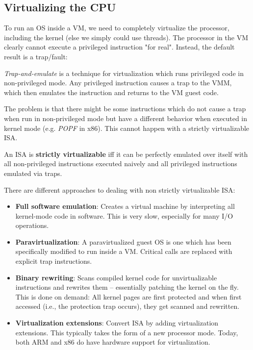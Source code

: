 \subsection{Virtualizing the CPU}

To run an OS inside a VM, we need to completely virtualize the processor, including the kernel (else we simply could use threads). The processor in the VM clearly cannot execute a privileged instruction "for real". Instead, the default result is a trap/fault: \medskip

\textit{Trap-and-emulate} is a technique for virtualization which runs privileged code in non-privileged mode. Any privileged instruction causes a trap to the VMM, which then emulates the instruction and returns to the VM guest code.\medskip

The problem is that there might be some instructions which do not cause a trap when run in non-privileged mode but have a different behavior when executed in kernel mode (e.g. \textit{POPF} in x86). This cannot happen with a strictly virtualizable ISA. \medskip

An ISA is \textbf{strictly virtualizable} iff it can be perfectly emulated over itself with all non-privileged instructions executed naively and all privileged instructions emulated via traps. \medskip

There are different approaches to dealing with non strictly virtualizable ISA:
\begin{itemize}
	\item \textbf{Full software emulation}: Creates a virtual machine by interpreting all kernel-mode code in software. This is very slow, especially for many I/O operations.
	\item \textbf{Paravirtualization}: A paravirtualized guest OS is one which has been specifically modified to run inside a VM. Critical calls are replaced with explicit trap instructions.
	\item \textbf{Binary rewriting}: Scans compiled kernel code for unvirtualizable instructions and rewrites them – essentially patching the kernel on the fly. This is done on demand: All kernel pages are first protected and when first accessed (i.e., the protection trap occurs), they get scanned and rewritten.	
	\item \textbf{Virtualization extensions}: Convert ISA by adding virtualization extensions. This typically takes the form of a new processor mode. Today, both ARM and x86 do have hardware support for virtualization.
\end{itemize}


